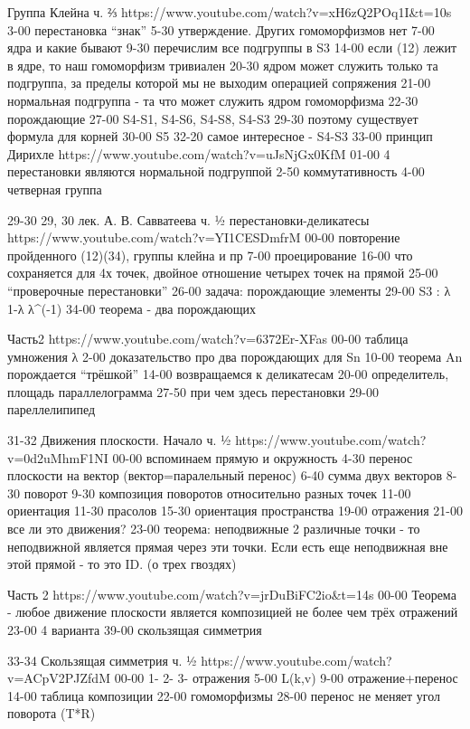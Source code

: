 Группа Клейна ч. ⅔
https://www.youtube.com/watch?v=xH6zQ2POq1I&t=10s
3-00 перестановка “знак”
5-30 утверждение. Других гомоморфизмов нет
7-00 ядра и какие бывают
9-30 перечислим все подгруппы в S3
14-00 если (12) лежит в ядре, то наш гомоморфизм тривиален
20-30 ядром может служить только та подгруппа, за пределы которой мы не выходим операцией сопряжения
21-00 нормальная подгруппа - та что может служить ядром гомоморфизма
22-30 порождающие
27-00 S4-S1, S4-S6, S4-S8, S4-S3
29-30 поэтому существует формула для корней
30-00 S5
32-20 самое интересное - S4-S3
33-00 принцип Дирихле
https://www.youtube.com/watch?v=uJsNjGx0KfM
 01-00 4 перестановки являются нормальной подгруппой
2-50 коммутативность
4-00 четверная группа

29-30
29, 30 лек. А. В. Савватеева ч. ½ перестановки-деликатесы
https://www.youtube.com/watch?v=YI1CESDmfrM
00-00 повторение пройденного (12)(34), группы клейна и пр
7-00 проецирование
16-00 что сохраняется для 4х точек, двойное отношение четырех точек на прямой
25-00 “проверочные перестановки”
26-00 задача: порождающие элементы
29-00 S3 :  λ 1-λ  λ^(-1)
34-00 теорема - два порождающих

Часть2
https://www.youtube.com/watch?v=6372Er-XFas
00-00 таблица умножения  λ
2-00 доказательство про два порождающих для Sn
10-00 теорема An порождается “трёшкой”
14-00 возвращаемся к деликатесам
20-00 определитель, площадь параллелограмма
27-50 при чем здесь перестановки
29-00 пареллелипипед

31-32
Движения плоскости. Начало ч. ½
https://www.youtube.com/watch?v=0d2uMhmF1NI
00-00 вспоминаем прямую и окружность
4-30 перенос плоскости на вектор (вектор=паралельный перенос)
6-40 сумма двух векторов
8-30 поворот
9-30 композиция поворотов относительно разных точек
11-00 ориентация
11-30 прасолов
15-30 ориентация пространства
19-00 отражения
21-00 все ли это движения?
23-00 теорема: неподвижные 2 различные точки - то неподвижной является прямая через эти точки. Если есть еще неподвижная вне этой прямой - то это ID. (о трех гвоздях)

Часть 2
https://www.youtube.com/watch?v=jrDuBiFC2io&t=14s
00-00 Теорема - любое движение плоскости является композицией не более чем трёх отражений
23-00 4 варианта
39-00 скользящая симметрия

33-34
Скользящая симметрия ч. ½
https://www.youtube.com/watch?v=ACpV2PJZfdM
00-00 1- 2- 3- отражения
5-00 L(k,v)
9-00 отражение+перенос
14-00 таблица композиции
22-00 гомоморфизмы
28-00 перенос не меняет угол поворота (T*R)

